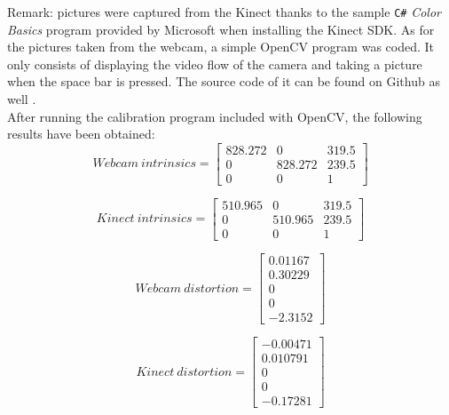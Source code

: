Remark: pictures were captured from the Kinect thanks to the sample \texttt{C\#} \textit{Color Basics} program provided by Microsoft when installing the Kinect SDK. As for the pictures taken from the webcam, a simple OpenCV program was coded. It only consists of displaying the video flow of the camera and taking a picture when the space bar is pressed. The source code of it can be found on Github as well \cite{github}.\\

After running the calibration program included with OpenCV, the following results have been obtained:\\

\begin{equation}
  Webcam\:intrinsics = \begin{bmatrix}
       828.272 & 0 & 319.5 \\
       0 & 828.272 & 239.5 \\
       0 & 0 & 1
     \end{bmatrix} 
\end{equation}

\begin{equation}
  Kinect\:intrinsics = \begin{bmatrix}
       510.965 & 0 & 319.5 \\
       0 & 510.965 & 239.5 \\
       0 & 0 & 1
     \end{bmatrix} 
\end{equation}

\begin{equation}
  Webcam\:distortion = \begin{bmatrix}
       0.01167 \\
       0.30229  \\
       0 \\
       0 \\
       -2.3152 
     \end{bmatrix} 
\end{equation}

\begin{equation}
  Kinect\:distortion = \begin{bmatrix}
       -0.00471 \\
       0.010791 \\
       0 \\
       0 \\
       -0.17281
     \end{bmatrix} 
\end{equation}

